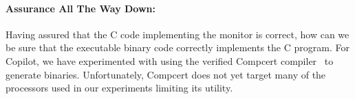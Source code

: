 \paragraph{Assurance All The Way Down:} 
Having assured that the C code implementing the monitor is correct,
how can we be sure that the executable binary code correctly
implements the C program. For Copilot, we have experimented
with using the verified Compcert compiler~\cite{leroy} to generate
binaries.  Unfortunately, Compcert does not yet target many of the
processors used in our experiments limiting its utility.




